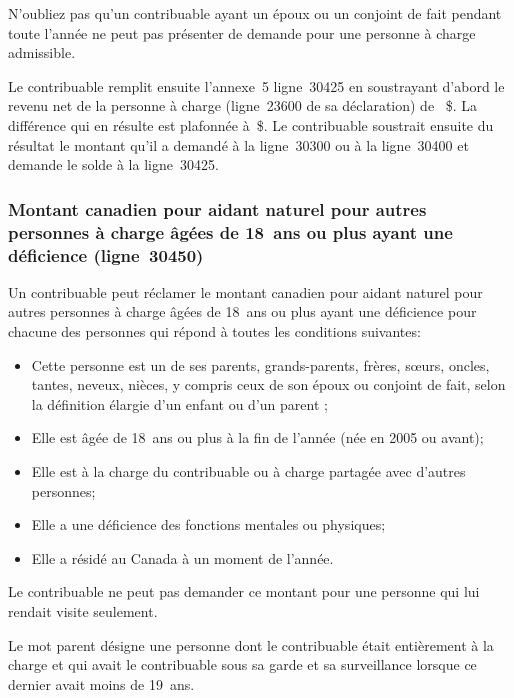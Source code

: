 \begin{rappel}
	N'oubliez pas qu'un contribuable ayant un époux ou un conjoint de fait pendant toute l'année ne peut pas présenter de demande pour une personne à charge admissible.
\end{rappel}

Le contribuable remplit ensuite l'annexe~5 ligne~30425 en soustrayant d'abord le revenu net de la personne à charge (ligne~23600 de sa déclaration) de ~\$. La différence qui en résulte est plafonnée à~\$. Le contribuable soustrait ensuite du résultat le montant qu'il a demandé à la ligne~30300 ou à la ligne~30400 et demande le solde à la ligne~30425.

\subsubsection{Montant canadien pour aidant naturel pour autres personnes à charge âgées de 18~ans ou plus ayant une déficience (ligne~30450)}
Un contribuable peut réclamer le montant canadien pour aidant naturel pour autres personnes à charge âgées de 18~ans ou plus ayant une déficience pour chacune des personnes qui répond à toutes les conditions suivantes:
\begin{itemize}
	\item Cette personne est un de ses parents, grands-parents, frères, sœurs, oncles, tantes, neveux, nièces, y compris ceux de son époux ou conjoint de fait, selon la définition élargie d'un \og enfant \fg{} ou d'un \og parent \fg{};
	\item Elle est âgée de 18~ans ou plus à la fin de l'année (née en 2005 ou avant);
	\item Elle est à la charge du contribuable ou à charge partagée avec d'autres personnes;
	\item Elle a une déficience des fonctions mentales ou physiques;
	\item Elle a résidé au Canada à un moment de l'année.
\end{itemize}

\begin{note}
	Le contribuable ne peut pas demander ce montant pour une personne qui lui rendait visite seulement.
\end{note}

Le mot \og parent \fg{} désigne une personne dont le contribuable était entièrement à la charge et qui avait le contribuable sous sa garde et sa surveillance lorsque ce dernier avait moins de 19~ans. 

